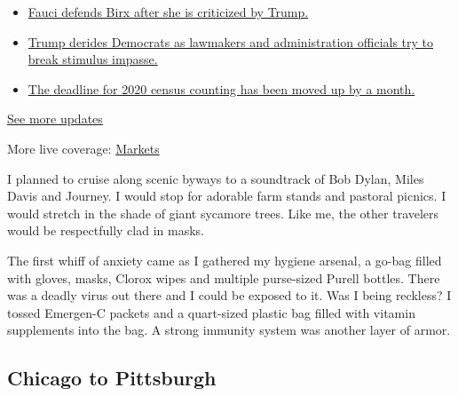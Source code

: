 \begin{itemize}
\tightlist
\item
  \href{https://www.nytimes.com/2020/08/03/world/coronavirus-covid-19.html?action=click\&pgtype=Article\&state=default\&region=MAIN_CONTENT_1\&context=storylines_live_updates\#link-4547638f}{Fauci
  defends Birx after she is criticized by Trump.}
\item
  \href{https://www.nytimes.com/2020/08/03/world/coronavirus-covid-19.html?action=click\&pgtype=Article\&state=default\&region=MAIN_CONTENT_1\&context=storylines_live_updates\#link-15e7f995}{Trump
  derides Democrats as lawmakers and administration officials try to
  break stimulus impasse.}
\item
  \href{https://www.nytimes.com/2020/08/03/world/coronavirus-covid-19.html?action=click\&pgtype=Article\&state=default\&region=MAIN_CONTENT_1\&context=storylines_live_updates\#link-e5a2cda}{The
  deadline for 2020 census counting has been moved up by a month.}
\end{itemize}

\href{https://www.nytimes.com/2020/08/03/world/coronavirus-covid-19.html?action=click\&pgtype=Article\&state=default\&region=MAIN_CONTENT_1\&context=storylines_live_updates}{See
more updates}

More live coverage:
\href{https://www.nytimes.com/live/2020/08/03/business/stock-market-today-coronavirus?action=click\&pgtype=Article\&state=default\&region=MAIN_CONTENT_1\&context=storylines_live_updates}{Markets}

I planned to cruise along scenic byways to a soundtrack of Bob Dylan,
Miles Davis and Journey. I would stop for adorable farm stands and
pastoral picnics. I would stretch in the shade of giant sycamore trees.
Like me, the other travelers would be respectfully clad in masks.

The first whiff of anxiety came as I gathered my hygiene arsenal, a
go-bag filled with gloves, masks, Clorox wipes and multiple purse-sized
Purell bottles. There was a deadly virus out there and I could be
exposed to it. Was I being reckless? I tossed Emergen-C packets and a
quart-sized plastic bag filled with vitamin supplements into the bag. A
strong immunity system was another layer of armor.

\hypertarget{chicago-to-pittsburgh}{%
\subsection{Chicago to Pittsburgh}\label{chicago-to-pittsburgh}}

